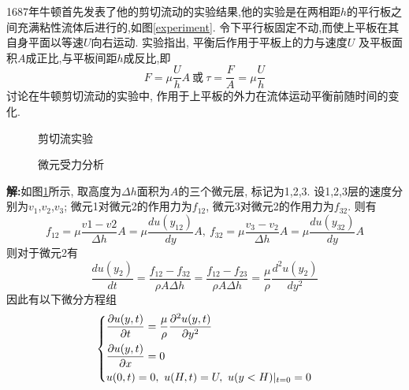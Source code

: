 \begin{problem}[问题1.1]
1687年牛顿首先发表了他的剪切流动的实验结果,他的实验是在两相距$h$的平行板之间充满粘性流体后进行的,如图\ref{experiment}. 令下平行板固定不动,而使上平板在其自身平面以等速$U$向右运动. 实验指出, 平衡后作用于平板上的力与速度$U$
及平板面积$A$成正比,与平板间距$h$成反比,即
\[
F = \mu \frac{U}{h}A {~}\textrm{或}{~} \tau = \frac{F}{A}=\mu\frac{U}{h}
\]
讨论在牛顿剪切流动的实验中, 作用于上平板的外力在流体运动平衡前随时间的变化.
\end{problem}


\begin{solution}
\begin{figure}[!htb]
\begin{minipage}[c]{.5\textwidth}
\centering

\caption{\label{experiment}剪切流实验}
\end{minipage}%
\begin{minipage}[c]{.5\textwidth}
\centering

\caption{\label{layers}微元受力分析}
\end{minipage}
\end{figure}

\textbf{解:}如图\ref{layers}所示, 取高度为$\Delta h$面积为$A$的三个微元层, 标记为1,2,3. 设1,2,3层的速度分别为$v_1$,$v_2$,$v_3$; 微元1对微元2的作用力为$f_{12}$, 微元3对微元2的作用力为$f_{32}$. 则有
\begin{equation}
f_{12} = \mu \frac{v1-v2}{\Delta h}A=\mu \frac{du(y_{12})}{dy}A, {~}f_{32} = \mu \frac{v_3-v_2}{\Delta h}A= \mu \frac{du(y_{32})}{dy}A
\end{equation}
则对于微元2有
\begin{equation}
\frac{du(y_2)}{dt} = \frac{f_{12} - f_{32}}{\rho A \Delta h}
= \frac{f_{12} - f_{23}}{\rho A \Delta h} = \frac{\mu}{\rho}\frac{d^2u(y_2)}{dy^2}
\end{equation}
因此有以下微分方程组
\begin{equation}\label{diff}
\begin{dcases}
\frac{\partial u(y,t)}{\partial t} = \frac{\mu}{\rho} \frac{\partial ^2 u(y,t)}{\partial y^2} \\
\frac{\partial u(y,t)}{\partial x} = 0 \\
u(0,t) = 0, {~}u(H,t) = U, {~}u(y<H)|_{t=0} = 0
\end{dcases}
\end{equation}


\end{solution}

